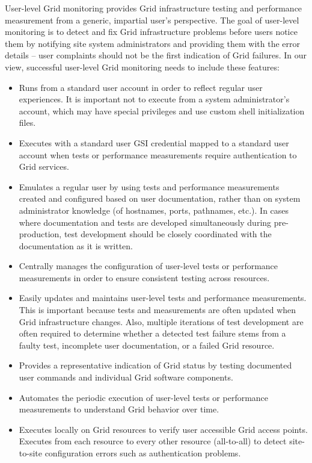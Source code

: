 \documentclass[times,10pt,twocolumn]{article}
\begin{document}
User-level Grid monitoring provides Grid infrastructure testing and performance measurement 
from a generic, impartial user's perspective.  The goal of user-level monitoring is 
to detect and fix Grid infrastructure problems before users notice them by
notifying site system administrators and providing them with the error details -- 
user complaints should not be the first indication of Grid failures.  
In our view, successful user-level Grid monitoring needs to include
these features:

\begin{itemize}

\item Runs from a standard user
account in order to reflect regular user experiences.  It is important not to execute from a system administrator's account,
which may have special privileges and use custom shell initialization files.

\item Executes with a standard user GSI credential mapped to a standard user
account when tests or performance measurements require authentication to Grid
services.

\item Emulates a regular user by using tests and performance measurements
created and configured based on user
documentation, rather than on system administrator knowledge (of hostnames,
ports, pathnames, etc.).  In cases where documentation and tests are developed
simultaneously during pre-production, test development should
be closely coordinated with the documentation as it is written.

\item Centrally manages the configuration of user-level tests or performance
measurements in order to ensure consistent testing across resources.

\item Easily updates and maintains user-level tests and performance
measurements.  This is important because tests and measurements are often
updated when Grid infrastructure changes.
Also, multiple iterations of test development are often required to
determine whether a detected test failure stems from a faulty test,
incomplete user documentation, or a failed Grid resource.  

\item Provides a representative indication of Grid status by testing
documented user commands and individual Grid software components.  

\item Automates the periodic execution of user-level tests or performance
measurements to understand Grid behavior over time.

\item Executes locally on Grid resources to verify user accessible Grid access
points.  Executes from each resource to every other resource (all-to-all) to
detect site-to-site configuration errors such as authentication problems.

\end{itemize}
\end{document}
